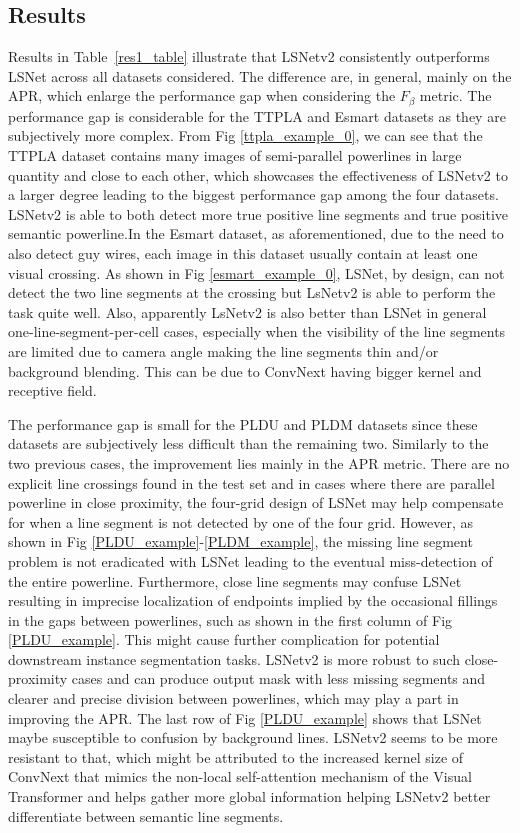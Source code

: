 \documentclass[journal]{IEEEtran}
\begin{document}
\subsection{Results}

 Results in Table~\ref{res1_table} illustrate that LSNetv2 consistently outperforms LSNet across all datasets considered. The difference are, in general, mainly on the APR, which enlarge the performance gap when considering the $F_{\beta}$ metric. The performance gap is considerable for the TTPLA and Esmart datasets as they are subjectively more complex.  From Fig \ref{ttpla_example_0}, we can see that the TTPLA dataset contains many images of semi-parallel powerlines in large quantity and close to each other, which showcases the effectiveness of LSNetv2 to a larger degree leading to the biggest performance gap among the four datasets. LSNetv2 is able to both detect more true positive line segments and true positive semantic powerline.In the Esmart dataset, as aforementioned, due to the need to also detect guy wires, each image in this dataset usually contain at least one visual crossing. As shown in Fig \ref{esmart_example_0}, LSNet, by design, can not detect the two line segments at the crossing but LsNetv2 is able to perform the task quite well. Also, apparently LsNetv2 is also better than LSNet in general one-line-segment-per-cell cases, especially when the visibility of the line segments are limited due to camera angle making the line segments thin and/or background blending. This can be due to ConvNext having bigger kernel and receptive field.
 
 The performance gap is small for the PLDU and PLDM datasets since these datasets are subjectively less difficult than the remaining two. Similarly to the two previous cases, the improvement lies mainly in the APR metric. There are no explicit line crossings found in the test set and in cases where there are parallel powerline in close proximity, the four-grid design of LSNet may help compensate for when a line segment is not detected by one of the four grid. However, as shown in Fig \ref{PLDU_example}-\ref{PLDM_example}, the missing line segment problem is not eradicated with LSNet leading to the eventual miss-detection of the entire powerline. Furthermore, close line segments may confuse LSNet resulting in imprecise localization of endpoints implied by the occasional fillings in the gaps between powerlines, such as shown in the first column of Fig \ref{PLDU_example}. This might cause further complication for potential downstream instance segmentation tasks. LSNetv2 is more robust to such close-proximity cases and can produce output mask with less missing segments and clearer and precise division between powerlines, which may play a part in improving the APR. The last row of Fig \ref{PLDU_example} shows that LSNet maybe susceptible to confusion by background lines. LSNetv2 seems to be more resistant to that, which might be attributed to the increased kernel size of ConvNext that mimics the non-local self-attention mechanism of the Visual Transformer \cite{visual_transformer} and helps gather more global information helping LSNetv2 better differentiate between semantic line segments.
\end{document}
